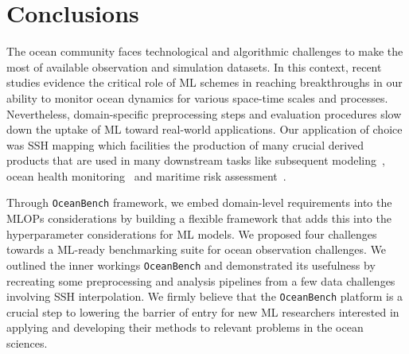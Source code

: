 \section{Conclusions} \label{sec:conclusions}

The ocean community faces technological and algorithmic challenges to make the most of available observation and simulation datasets. 
In this context, recent studies evidence the critical role of ML schemes in reaching breakthroughs in our ability to monitor ocean dynamics for various space-time scales and processes. 
Nevertheless, domain-specific preprocessing steps and evaluation procedures slow down the uptake of ML toward real-world applications. 
Our application of choice was SSH mapping which facilities the production of many crucial derived products that are used in many downstream tasks like subsequent modeling~\citep{ML4OCN}, ocean health monitoring~\citep{ML4NATURECONSERVATION,OCNHEALTH,OCEANHEALTH2} and maritime risk assessment~\citep{SSHOPERATIONAL}.

Through \texttt{OceanBench} framework, we embed domain-level requirements into the MLOPs considerations by building a flexible framework that adds this into the hyperparameter considerations for ML models. 
We proposed four challenges towards a ML-ready benchmarking suite for ocean observation challenges. 
We outlined the inner workings \texttt{OceanBench} and demonstrated its usefulness by recreating some preprocessing and analysis pipelines from a few data challenges involving SSH interpolation.
We firmly believe that the \texttt{OceanBench} platform is a crucial step to lowering the barrier of entry for new ML researchers interested in applying and developing their methods to relevant problems in the ocean sciences.



